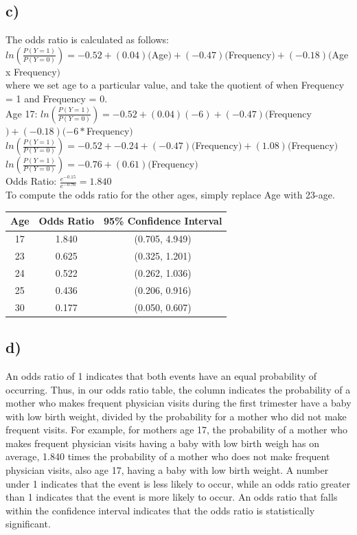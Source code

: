 \documentclass[12pt, letterpaper]{article}
\begin{document}
\subsection*{c)} The odds ratio is calculated as follows: \\
$ln(\frac{P(Y=1)}{P(Y=0)}) = -0.52 + (0.04)($Age$) + (-0.47)($Frequency$) + (-0.18)($Age x Frequency$)$\\
where we set age to a particular value, and take the quotient of when Frequency = 1 and Frequency = 0.\\
Age 17: $ln(\frac{P(Y=1)}{P(Y=0)}) = -0.52 + (0.04)(-6) + (-0.47)($Frequency$) + (-0.18)(-6 * $Frequency$)$\\
$ln(\frac{P(Y=1)}{P(Y=0)}) = -0.52 + -0.24 + (-0.47)($Frequency$) + (1.08)($Frequency$)$\\
$ln(\frac{P(Y=1)}{P(Y=0)}) = -0.76 + (0.61)($Frequency$)$\\
Odds Ratio: $\frac{e^{-0.15}}{e^{-0.76}} = 1.840$\\
To compute the odds ratio for the other ages, simply replace Age with 23-age.\\
 \begin{tabular}{ |c|c|c| } 
 \hline
 \textbf{Age} & \textbf{Odds Ratio} & \textbf{95\% Confidence Interval} \\ 
\hline
 17 & 1.840 & (0.705, 4.949) \\ 
\hline
 23 & 0.625 & (0.325, 1.201) \\ 
 \hline
 24 & 0.522 & (0.262, 1.036) \\ 
 \hline
 25 & 0.436 & (0.206, 0.916) \\ 
 \hline
 30 & 0.177 & (0.050, 0.607) \\ 
 \hline
\end{tabular}

\subsection*{d)} An odds ratio of 1 indicates that both events have an equal probability of occurring. Thus, in our odds ratio table, the column indicates the probability of a mother who makes frequent physician visits during the first trimester have a baby with low birth weight, divided by the probability for a mother who did not make frequent visits. For example, for mothers age 17, the probability of a mother who makes frequent physician visits having a baby with low birth weigh has on average, 1.840 times the probability of a mother who does not make frequent physician visits, also age 17,  having a baby with low birth weight. A number under 1 indicates that the event is less likely to occur, while an odds ratio greater than 1 indicates that the event is more likely to occur. An odds ratio that falls within the confidence interval indicates that the odds ratio is statistically significant.
\end{document}
